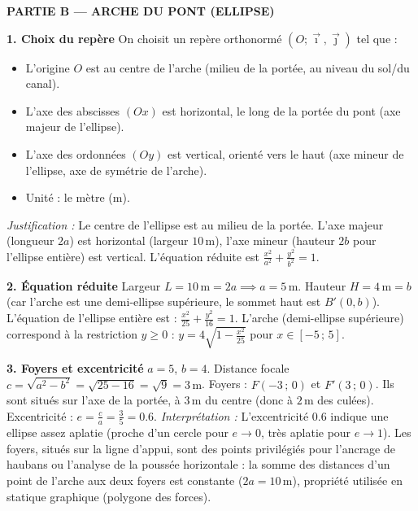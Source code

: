 \documentclass[11pt]{article}
\newcommand{\cle}[1]{{\popxbold\color{popdark}#1}}
\begin{document}
\begin{exoresolu}
\medskip
\noindent \textbf{PARTIE B — ARCHE DU PONT (ELLIPSE)}

\medskip
\noindent \textbf{1. Choix du repère}
On choisit un repère orthonormé $(O;\vec{\imath},\vec{\jmath})$ tel que :
\begin{itemize}
    \item L'origine $O$ est au centre de l'arche (milieu de la portée, au niveau du sol/du canal).
    \item L'axe des abscisses $(Ox)$ est horizontal, le long de la portée du pont (axe majeur de l'ellipse).
    \item L'axe des ordonnées $(Oy)$ est vertical, orienté vers le haut (axe mineur de l'ellipse, axe de symétrie de l'arche).
    \item Unité : le mètre ($\text{m}$).
\end{itemize}
\emph{Justification :} Le centre de l'ellipse est au milieu de la portée. L'axe majeur (longueur $2a$) est horizontal (largeur $\num{10}\,\text{m}$), l'axe mineur (hauteur $2b$ pour l'ellipse entière) est vertical. L'équation réduite est $\frac{x^2}{a^2}+\frac{y^2}{b^2}=1$.

\medskip
\noindent \textbf{2. Équation réduite}
Largeur $L = \num{10}\,\text{m} = 2a \implies a = \num{5}\,\text{m}$.
Hauteur $H = \num{4}\,\text{m} = b$ (car l'arche est une demi-ellipse supérieure, le sommet haut est $B'(0,b)$).
L'équation de l'ellipse entière est :
\cle{$\frac{x^2}{25} + \frac{y^2}{16} = 1$}.
L'arche (demi-ellipse supérieure) correspond à la restriction $y \ge 0$ : \cle{$y = 4\sqrt{1 - \frac{x^2}{25}}$} pour $x \in [-\num{5}\,;\, \num{5}]$.

\medskip
\noindent \textbf{3. Foyers et excentricité}
$a=\num{5}$, $b=\num{4}$. Distance focale $c = \sqrt{a^2 - b^2} = \sqrt{25 - 16} = \sqrt{9} = \num{3}\,\text{m}$.
Foyers : \cle{$F(-\num{3}\,;\,0)$} et \cle{$F'(\num{3}\,;\,0)$}. Ils sont situés sur l'axe de la portée, à $\num{3}\,\text{m}$ du centre (donc à $\num{2}\,\text{m}$ des culées).
Excentricité : \cle{$e = \frac{c}{a} = \frac{3}{5} = \num{0,6}$}.
\emph{Interprétation :} L'excentricité $\num{0,6}$ indique une ellipse assez aplatie (proche d'un cercle pour $e\to 0$, très aplatie pour $e\to 1$). Les foyers, situés sur la ligne d'appui, sont des points privilégiés pour l'ancrage de haubans ou l'analyse de la poussée horizontale : la somme des distances d'un point de l'arche aux deux foyers est constante ($2a=\num{10}\,\text{m}$), propriété utilisée en statique graphique (polygone des forces).


\end{exoresolu}
\end{document}

